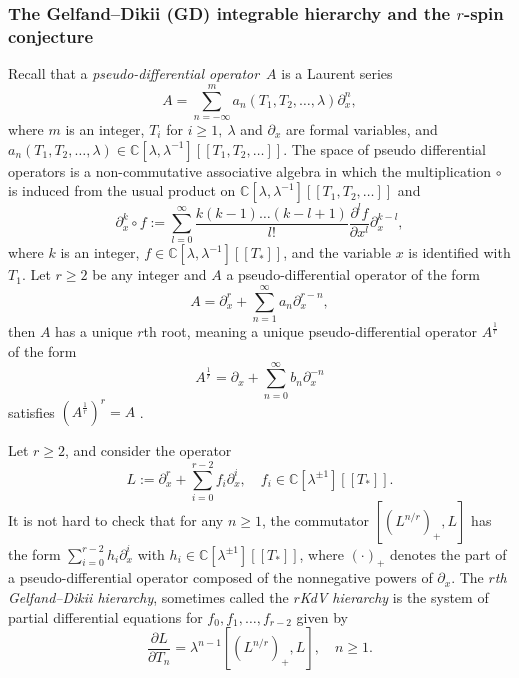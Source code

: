 \documentclass[11pt]{amsart}
\theoremstyle{definition}
\theoremstyle{remark}
\renewcommand{\d}{\ensuremath{\partial}}
\newcommand{\<}{\left<}
\renewcommand{\>}{\right>}
\numberwithin{equation}{section}
\def\C{{\mathbb C}}
\begin{document}
\subsubsection{The Gelfand--Dikii (GD) integrable hierarchy and the $r$-spin conjecture}\label{subsub:rGD_closed}

Recall that a {\it pseudo-differential operator}~$A$ is a Laurent series
\[
A=\sum_{n=-\infty}^m a_n(T_1,T_2,\ldots,\lambda)\partial_x^n,
\]
where $m$ is an integer,  $T_i$ for $i\geq 1,~\lambda$ and $\partial_x$ are formal variables, and $a_n(T_1,T_2,\ldots,\lambda)\in\C[\lambda,\lambda^{-1}][[T_1,T_2,\ldots]]$.     The space of pseudo differential operators is a non-commutative %
associative algebra in %
which the multiplication $\circ$ is induced from the usual product on $\C[\lambda,\lambda^{-1}][[T_1,T_2,\ldots]]$ and 
\[
\d_x^k\circ f:=\sum_{l=0}^\infty\frac{k(k-1)\ldots(k-l+1)}{l!}\frac{\d^lf}{\d x^l}\d_x^{k-l},
\]
where $k$ is an integer, $f\in\mathbb C[\lambda,\lambda^{-1}][[T_*]]$, and the variable $x$ is identified with $T_1$. Let $r\geq 2$ be %
any integer and %
$A$ a pseudo-differential operator of the form
\[
A=\partial_x^r+\sum_{n=1}^\infty a_n\partial_x^{r-n},
\]
then $A$ has a unique $r$th root, meaning a unique pseudo-differential operator $A^{\frac{1}{r}}$ of the %
form
\[
A^{\frac{1}{r}}=\partial_x+\sum_{n=0}^\infty b_n\partial_x^{-n}
\]
satisfies $\left(A^{\frac{1}{r}}\right)^r=A$%
.

Let $r\geq 2$, and consider the operator
$$
L:=\partial_x^r+\sum_{i=0}^{r-2}f_i\partial_x^i,\quad f_i\in\C[\lambda^{\pm1}][[T_*]].
$$
It is not hard to check that for any $n\geq 1$, the commutator $[(L^{n/r})_+,L]$ has the form $\sum_{i=0}^{r-2}h_i\partial_x^i$ with $h_i\in\C[\lambda^{\pm1}][[T_*]]$, where $(\cdot)_+$ denotes the part of a pseudo-differential operator composed of %
the nonnegative powers %
of $\partial_x$. The {\it $r$th Gelfand--Dikii hierarchy}, sometimes called %
the \emph{$r$KdV hierarchy} is %
the system of partial differential equations for $f_0,f_1,\ldots,f_{r-2}$ %
given by
\begin{equation}
    \label{eq:GD_hier}
\frac{\partial L}{\partial T_n}=\lambda^{n-1}[(L^{n/r})_+,L],\quad n\geq 1.
\end{equation}
\end{document}
